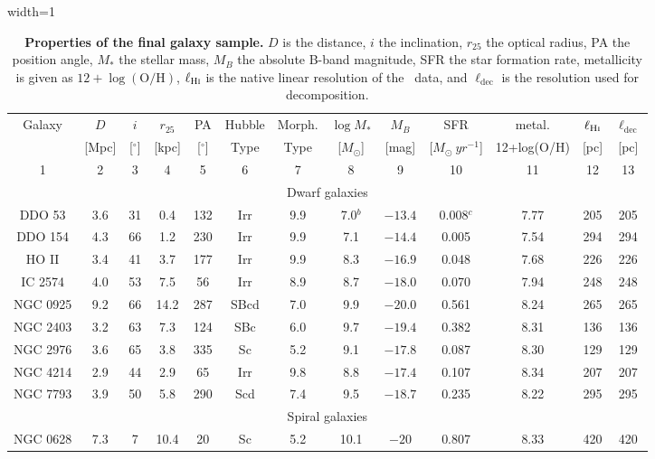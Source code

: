 \begin{table}[htbp]
	\centering
	\caption{\textbf{Properties of the final galaxy sample.} $D$ is the distance, $i$ the inclination, $r_{25}$ the optical radius, PA the position angle, $M_*$ the stellar mass, $M_B$ the absolute B-band magnitude, SFR the star formation rate, metallicity is given as $12+\log(\mathrm{O/H})$, $\ell_{\textrm{H\textsc{i}}}$ is the native linear resolution of the \HI\ data, and $\ell_{\mathrm{dec}}$ is the resolution used for decomposition.}
	\begin{adjustbox}{width=1\textwidth}
		\begin{tabular}{|ccccccccccccc|}
			\hline\hline
			Galaxy & $D$ & $i$ & $r_{25}$ & PA & Hubble &Morph.& $\log M_*$ & $M_B$ & SFR &metal. & $\ell_{\textrm{H\textsc{i}}}$ & $\ell_{\mathrm{dec}}$ \\[-1pt]
			& [Mpc] & [$^\circ$] & [kpc] & [$^\circ$] & Type &Type& [$M_\odot$] & [mag]&[$M_{\odot}\ yr^{-1}$] &12+log(O/H) & [pc] & [pc] \\
			1 	&	2	&	3	&	4	&	5	&	6	&	7	&	8	&	9	&	10	&	11 & 12 & 13 \\
			\hline
			\multicolumn{13}{|c|}{\rule[-5pt]{0pt}{20pt}Dwarf galaxies} \\
			DDO 53 & 3.6 & 31 & 0.4 & 132 & Irr &9.9& 7.0$^b$ & $-13.4$ &0.008$^c$& 7.77 & 205 & 205 \\
			DDO 154 & 4.3 & 66 & 1.2 & 230 & Irr &9.9& 7.1 & $-14.4$ &0.005& 7.54 & 294 & 294 \\
			HO II & 3.4 & 41 & 3.7 & 177 & Irr &9.9& 8.3 & $-16.9$ &0.048& 7.68 & 226 & 226 \\
			IC 2574 & 4.0 & 53 & 7.5 & 56 & Irr &8.9& 8.7 & $-18.0$ &0.070& 7.94 & 248 & 248 \\
			NGC 0925 & 9.2 & 66 & 14.2 & 287 & SBcd &7.0& 9.9 & $-20.0$ &0.561& 8.24 & 265 & 265 \\
			NGC 2403 & 3.2 & 63 & 7.3 & 124 & SBc &6.0& 9.7 & $-19.4$ &0.382& 8.31 & 136 & 136 \\
			NGC 2976 & 3.6 & 65 & 3.8 & 335 & Sc &5.2& 9.1 & $-17.8$ &0.087& 8.30 & 129 & 129 \\
			NGC 4214 & 2.9 & 44 & 2.9 & 65 & Irr &9.8& 8.8 & $-17.4$ &0.107& 8.34 & 207 & 207 \\
			NGC 7793 & 3.9 & 50 & 5.8 & 290 & Scd &7.4& 9.5 & $-18.7$ &0.235& 8.22 & 295 & 295 \\
			\hline
			\multicolumn{13}{|c|}{\rule[-5pt]{0pt}{20pt}Spiral galaxies} \\
			NGC 0628 & 7.3 & 7 & 10.4 & 20 & Sc &5.2& 10.1 & $-20$ &0.807& 8.33 & 420 & 420 \\

\end{tabular}
\end{adjustbox}
\end{table}
